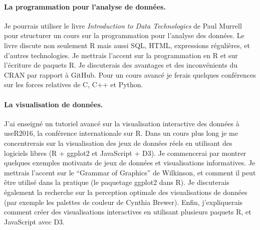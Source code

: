 \documentclass{article}
\begin{document}


\paragraph{La programmation pour l'analyse de données.} 
Je pourrais utiliser le livre \emph{Introduction to Data Technologies}
de Paul Murrell pour structurer un cours sur la programmation pour
l'analyse des données. Le livre discute non seulement R mais aussi
SQL, HTML, expressions régulières, et d'autres technologies. Je mettrais l'accent sur la programmation
en R et sur l'écriture de paquets R. Je 
discuterais des avantages et des inconvénients du CRAN par rapport à
GitHub. Pour un cours avancé je ferais quelques conférences sur les
forces relatives de C, C++ et Python.

\paragraph{La visualisation de données.} 
J'ai enseigné un tutoriel avancé sur la visualisation interactive des
données à useR2016, la conférence internationale sur R. Dans un cours
plus long je me concentrerais sur la visualisation des jeux de
données réels en utilisant des logiciels libres (R + ggplot2 et
JavaScript + D3). Je commencerai par montrer quelques exemples
motivants de jeux de données et visualisations informatives. Je 
mettrais l'accent sur le ``Grammar of Graphics'' de Wilkinson, et
comment il peut être utilisé dans la pratique (le paquetage ggplot2
dans R). Je discuterais également la recherche sur la
perception optimale des visualisations de données (par exemple les
palettes de couleur de Cynthia Brewer). Enfin, j'expliquerais
comment créer des visualisations interactives en utilisant plusieurs
paquets R, et JavaScript avec D3.
\end{document}
